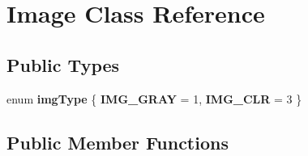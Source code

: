 \hypertarget{class_image}{\section{Image Class Reference}
\label{class_image}
}
\subsection*{Public Types}
\begin{DoxyCompactItemize}
\item 
enum {\bfseries img\-Type} \{ {\bfseries I\-M\-G\-\_\-\-G\-R\-A\-Y} =  1, 
{\bfseries I\-M\-G\-\_\-\-C\-L\-R} =  3
 \}
\end{DoxyCompactItemize}
\subsection*{Public Member Functions}
